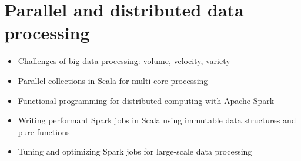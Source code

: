 \chapter{Parallel and distributed data processing }


\begin{itemize}
    \item Challenges of big data processing: volume, velocity, variety
    \item Parallel collections in Scala for multi-core processing
    \item Functional programming for distributed computing with Apache Spark
    \item Writing performant Spark jobs in Scala using immutable data structures and pure functions
    \item Tuning and optimizing Spark jobs for large-scale data processing
\end{itemize}
